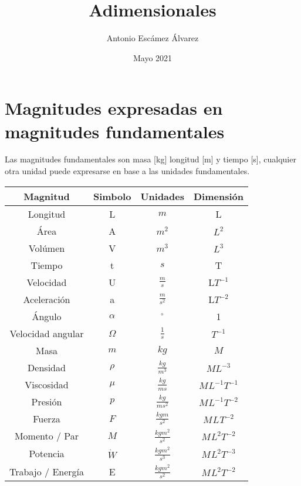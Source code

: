 \documentclass[10pt,a4paper]{article}
\title{Adimensionales}
\author{Antonio Escámez Álvarez}
\date{Mayo 2021}
\begin{document}
\maketitle
\newpage
\tableofcontents
\newpage
\setcounter{section}{-1}
\section{Magnitudes expresadas en magnitudes fundamentales}
Las magnitudes fundamentales son masa [kg] longitud [m] y tiempo [s], cualquier otra unidad puede expresarse en base a las unidades fundamentales.

\begin{center}
\begin{tabular}{ c | c | c | c}
  Magnitud  & Simbolo  & Unidades  & Dimensión \\
   \hline
    Longitud & L   & $m$  & L 
    \\\hline
    
    Área & A  & $m^2$  & $L^2$ 
    \\\hline
    
    Volúmen & V  & $m^3$  & $L^3$
    \\\hline
    
    Tiempo & t & $s$  & T 
    \\\hline
    
    Velocidad & U  & $\frac{m}{s}$  & L$T^{-1}$
    \\\hline
    
    Aceleración & a & $\frac{m}{s^2}$ & L$T^{-2}$ 
    \\\hline
    
    Ángulo & $\alpha$ & $^{\circ}$ & 1
    \\\hline
    
   Velocidad angular & $\Omega$ & $\frac{1}{s}$ & $T^{-1}$
   \\\hline
   
    Masa & $m$ & $kg$ & $M$
    \\\hline
    
    Densidad & $\rho$ & $\frac{kg}{m^3}$ & $ML^{-3}$
    \\\hline
    
    Viscosidad & $\mu$ & $\frac{kg}{m s}$ & $M^{}L^{-1}T^{-1}$
    \\\hline
    
    Presión & $p$ & $\frac{kg}{m s^2}$ & $M^{}L^{-1}T^{-2}$
    \\\hline
    
    Fuerza & $F$ & $\frac{kg m}{s^2}$ & $M^{}L^{}T^{-2}$
    \\\hline
    
    Momento / Par & $M$ & $\frac{kg m^2}{s^2}$ & $M^{}L^{2}T^{-2}$
    \\\hline
    
    Potencia & $\dot{W}$ & $\frac{kg m^2}{s^3}$ & $M^{}L^{2}T^{-3}$
    \\\hline
    
    Trabajo / Energía & E & $\frac{kg m^2}{s^2}$ & $M^{}L^{2}T^{-2}$
  
\end{tabular}
\end{center}
\end{document}
